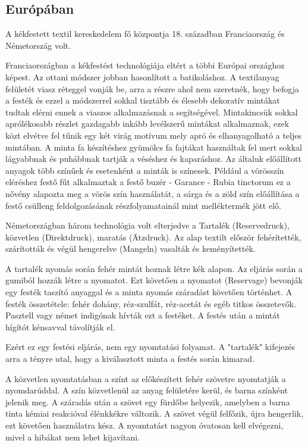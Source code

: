 \documentclass[fontsize=12pt, appendixprefix=true]{scrreprt}
\begin{document}

\subsection{Európában}
A kékfestett textil kereskedelem fő központja 18. században Franciaország  és Németország volt.

\vspace*{3 mm}
Franciaországban a kékfestést technológiája eltért a többi Európai országhoz képest. Az ottani módszer jobban hasonlított a batikoláshoz. A textilanyag felületét viasz réteggel vonják be, arra a részre ahol nem szeretnék, hogy befogja a festék és ezzel a módszerrel sokkal tisztább és élesebb dekoratív mintákat tudtak elérni ennek a viaszos alkalmazásnak a segítségével.
Mintakincsük sokkal aprólékosabb részlet gazdagabb inkább levélszerű mintákat alkalmaznak, ezek közt elvétve fel tűnik egy két virág motívum mely apró és elhanyagolható a teljes mintában.
A minta fa készítéshez gyümölcs fa fajtákat használtak fel mert sokkal lágyabbnak és puhábbnak tartják a véséshez és kaparáshoz. Az általuk előállított anyagok több színűek és esetenként a minták is színesek.
Például a vörösszín eléréshez festő fűt alkalmaztak a festő buzér - Garance - Rubia tinctorum  ez a nővény alapozta meg a vörös szín használatát, 
a sárga és a zöld szín előállítása a festő csülleng feldolgozásának részfolyamatainál mint melléktermék jött elő.

\vspace*{3 mm}
Németországban három technológia volt elterjedve a Tartalék (Reservedruck), közvetlen (Direktdruck), maratás (Ätzdruck). Az alap textilt először fehérítették, szárították és végül hengerelve (Mangeln) vasalták és keményítették.

A tartalék nyomás során fehér mintát hoznak létre kék alapon. Az eljárás során a gumiból hozzák létre a nyomatot. Ezt követően a nyomatot (Reservage) bevonják egy festék taszító anyaggal és a minta nyomás száradást követően történhet. A festék összetétele: fehér dohány, réz-szulfát, réz-acetát és egéb titkos összetevők. Pasztell vagy német indigónak hívták ezt a festéket. A festés után a mintát hígítót kénsavval távolítják el.

Ezért ez egy festési eljárás, nem egy nyomtatási folyamat. A "tartalék" kifejezés arra a tényre utal, hogy a kiválasztott minta a festés során kimarad.

A közvetlen nyomtatásban a színt az előkészített fehér szövetre nyomtatják a nyomdarúddal. A szín közvetlenül az anyag felületére kerül, és barna színként jelenik meg. A száradás után a szövet egy fürdőbe helyezik, amelyben a barna tinta kémiai reakcióval élénkkékre változik. A szövet végül felfőzik, újra hengerlik, ezt követően használatra kész. A nyomtatást nagyon óvatosan kell elvégezni, mivel a hibákat nem lehet kijavítani.
\end{document}
